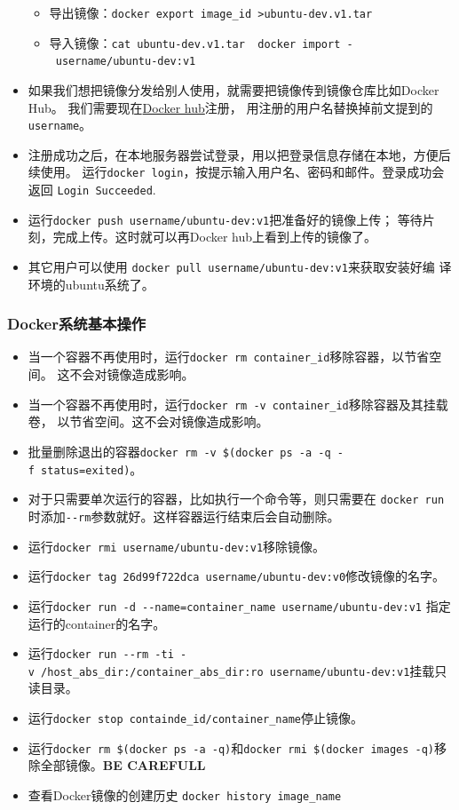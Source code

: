 \documentclass[]{article}
\providecommand{\tightlist}{%
  \setlength{\itemsep}{0pt}\setlength{\parskip}{0pt}}
\numberwithin{figure}{section}
\numberwithin{table}{section}
\begin{document}
\begin{itemize}
  \begin{itemize}
  \tightlist
  \item
    导出镜像：\texttt{docker\ export\ image\_id\ \textgreater{}ubuntu-dev.v1.tar}
  \item
    导入镜像：\texttt{cat\ ubuntu-dev.v1.tar\ \textbar{}\ docker\ import\ -\ username/ubuntu-dev:v1}
  \end{itemize}
\item
  如果我们想把镜像分发给别人使用，就需要把镜像传到镜像仓库比如Docker Hub。
  我们需要现在\href{https://hub.docker.com}{Docker hub}注册，
  用注册的用户名替换掉前文提到的\texttt{username}。
\item
  注册成功之后，在本地服务器尝试登录，用以把登录信息存储在本地，方便后续使用。
  运行\texttt{docker\ login}，按提示输入用户名、密码和邮件。登录成功会返回
  \texttt{Login\ Succeeded}.
\item
  运行\texttt{docker\ push\ username/ubuntu-dev:v1}把准备好的镜像上传；
  等待片刻，完成上传。这时就可以再Docker hub上看到上传的镜像了。
\item
  其它用户可以使用 \texttt{docker\ pull\ username/ubuntu-dev:v1}来获取安装好编
  译环境的ubuntu系统了。
\end{itemize}

\hypertarget{docker_basic_operation}{%
\subsubsection{Docker系统基本操作}\label{docker_basic_operation}}

\begin{itemize}
\item
  当一个容器不再使用时，运行\texttt{docker\ rm\ container\_id}移除容器，以节省空间。
  这不会对镜像造成影响。
\item
  当一个容器不再使用时，运行\texttt{docker\ rm\ -v\ container\_id}移除容器及其挂载卷，
  以节省空间。这不会对镜像造成影响。
\item
  批量删除退出的容器\texttt{docker\ rm\ -v\ \$(docker\ ps\ -a\ -q\ -f\ status=exited)}。
\item
  对于只需要单次运行的容器，比如执行一个命令等，则只需要在
  \texttt{docker\ run}时添加\texttt{-\/-rm}参数就好。这样容器运行结束后会自动删除。
\item
  运行\texttt{docker\ rmi\ username/ubuntu-dev:v1}移除镜像。
\item
  运行\texttt{docker\ tag\ 26d99f722dca\ username/ubuntu-dev:v0}修改镜像的名字。
\item
  运行\texttt{docker\ run\ -d\ -\/-name=container\_name\ username/ubuntu-dev:v1}
  指定运行的container的名字。
\item
  运行\texttt{docker\ run\ -\/-rm\ -ti\ -v\ /host\_abs\_dir:/container\_abs\_dir:ro\ username/ubuntu-dev:v1}挂载只读目录。
\item
  运行\texttt{docker\ stop\ containde\_id/container\_name}停止镜像。
\item
  运行\texttt{docker\ rm\ \$(docker\ ps\ -a\ -q)}和\texttt{docker\ rmi\ \$(docker\ images\ -q)}移除全部镜像。\textbf{BE CAREFULL}
\item
  查看Docker镜像的创建历史 \texttt{docker\ history\ image\_name}
\end{itemize}
\end{document}
